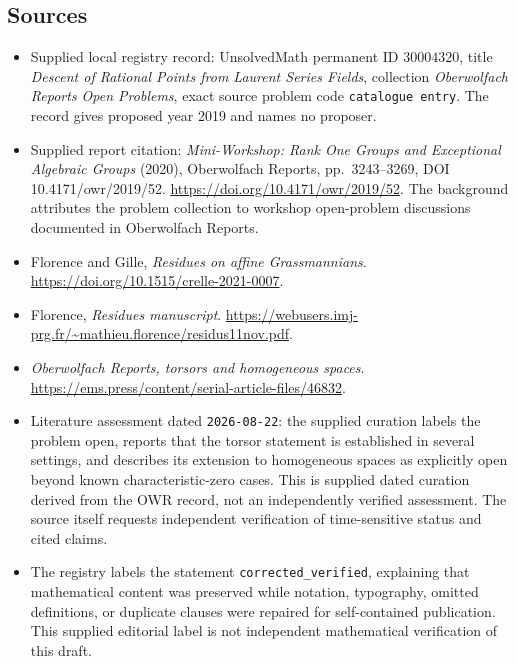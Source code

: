 \documentclass[11pt]{article}
\begin{document}
\subsection{Sources}
\begin{itemize}
\item Supplied local registry record: UnsolvedMath permanent ID \(30004320\), title \emph{Descent of Rational Points from Laurent Series Fields}, collection \emph{Oberwolfach Reports Open Problems}, exact source problem code \texttt{catalogue entry}. The record gives proposed year 2019 and names no proposer.
\item Supplied report citation: \emph{Mini-Workshop: Rank One Groups and Exceptional Algebraic Groups} (2020), Oberwolfach Reports, pp.\ 3243--3269, DOI 10.4171/owr/2019/52. \url{https://doi.org/10.4171/owr/2019/52}. The background attributes the problem collection to workshop open-problem discussions documented in Oberwolfach Reports.
\item Florence and Gille, \emph{Residues on affine Grassmannians}. \url{https://doi.org/10.1515/crelle-2021-0007}.
\item Florence, \emph{Residues manuscript}. \url{https://webusers.imj-prg.fr/~mathieu.florence/residus11nov.pdf}.
\item \emph{Oberwolfach Reports, torsors and homogeneous spaces}. \url{https://ems.press/content/serial-article-files/46832}.
\item Literature assessment dated \texttt{2026-08-22}: the supplied curation labels the problem open, reports that the torsor statement is established in several settings, and describes its extension to homogeneous spaces as explicitly open beyond known characteristic-zero cases. This is supplied dated curation derived from the OWR record, not an independently verified assessment. The source itself requests independent verification of time-sensitive status and cited claims.
\item The registry labels the statement \texttt{corrected\_verified}, explaining that mathematical content was preserved while notation, typography, omitted definitions, or duplicate clauses were repaired for self-contained publication. This supplied editorial label is not independent mathematical verification of this draft.
\end{itemize}
\end{document}
